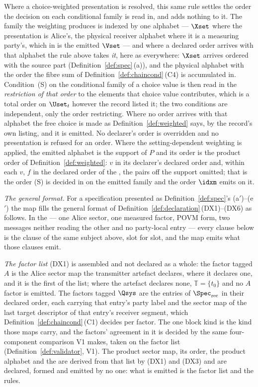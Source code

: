 \begin{definition}
Where a choice-weighted presentation is resolved, this same rule settles the
order the decision on each conditional family is read in, and adds nothing to
it. The family the weighting produces is indexed by one alphabet --- $\Xset$
where the presentation is Alice's, the physical receiver alphabet where it is
a measuring party's, which in  is the emitted $\Vset$ --- and where a declared order
arrives with that alphabet the rule above takes \emph{it}, here as everywhere:
$\Xset$ arrives ordered with the source part
(Definition~\ref{def:spec}\,(a)), and the physical alphabet with the order the
fibre sum of Definition~\ref{def:chaincond}\,(C4) is accumulated in.
Condition~(S) on the conditional family of a choice value is then read in the
\emph{restriction of that order} to the elements that choice value
contributes, which is a total order on $\Uset_t$ however the record listed
it; the two conditions are independent, only the order restricting. Where no order arrives with that alphabet the
free choice is made as Definition~\ref{def:weighted} says, by the record's own
listing, and it is emitted. No declarer's order is overridden and no
presentation is refused for an order. Where the setting-dependent weighting is applied,
the emitted alphabet is the support of $P$ and its order is the product order
of Definition~\ref{def:weighted}: $v$ in its declarer's declared order and,
within each $v$, $f$ in the declared order of the , the
pairs off the support omitted; that is the order (S) is decided in on the
emitted family and the order $\idxm$ emits on it.

\emph{The general format.} For a specification presented as
Definition~\ref{def:spec}'s (a$'$)--(e$'$) the map fills the general format
of Definition~\ref{def:declaration}\,(DX1)--(DX6) as follows. In the
 --- one Alice sector, one measured factor, POVM form, two
messages neither reading the other and no party-local entry --- every clause
below is the clause of the same subject above, slot for slot, and the map
emits what those clauses emit.

\emph{The factor list} (DX1) is assembled and not declared as a whole: the
factor tagged $A$ is the Alice sector map the transmitter artefact declares,
where it declares one, and it is the first of the list; where the artefact
declares none, $\mathbb{T}=\{t_0\}$ and no $A$ factor is emitted. The factors
tagged $\Qsys$ are the entries of $\Spec_{\mathrm{rec}}$ in their declared
order, each carrying that entry's party label and the sector map of the last
target descriptor of that entry's receiver segment, which
Definition~\ref{def:chaincond}\,(C1) decides per factor. The one block kind
is the kind those maps carry, and the factors' agreement in it is decided by
the same four-component comparison V1 makes, taken on the factor list
(Definition~\ref{def:validator}, V1).
The product sector map, its order, the product alphabet and the
 are derived from that list by (DX1) and (DX3) and are
declared, formed and emitted by no one: what is emitted is the factor list and
the rules.


\end{definition}
